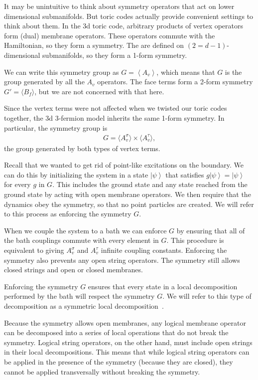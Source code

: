 \documentclass[twocolumn, longbibliography]{revtex4-2}
\newcommand{\ket}[1]{\left|#1\right\rangle}
\begin{document}
It may be unintuitive to think about symmetry operators that act on lower dimensional submanifolds. But toric codes actually provide convenient settings to think about them. In the 3d toric code, arbitrary products of vertex operators form (dual) membrane operators. These operators commute with the Hamiltonian, so they form a symmetry. The are defined on $(2=d-1)$-dimensional submanifolds, so they form a 1-form symmetry. 

We can write this symmetry group as $G=\left\langle A_v\right \rangle$, which means that $G$ is the group generated by all the $A_v$ operators.
The face terms form a 2-form symmetry $G'=\langle B_f\rangle$, but we are not concerned with that here.

Since the vertex terms were not affected when we twisted our toric codes together, the 3d 3-fermion model inherits the same 1-form symmetry. In particular, the symmetry group is 
\begin{align}
G = \langle A_v^\sigma\rangle \times \langle A_v^\tau \rangle,
\end{align}
the group generated by both types of vertex terms.

Recall that we wanted to get rid of point-like excitations on the boundary. We can do this by initializing the system in a state $\ket{\psi}$ that satisfies $g\ket{\psi}=\ket{\psi}$ for every $g$ in $G$. This includes the ground state and any state reached from the ground state by acting with open membrane operators. We then require that the dynamics obey the symmetry, so that no point particles are created. We will refer to this process as enforcing the symmetry $G$.

When we couple the system to a bath we can enforce $G$ by ensuring that all of the bath couplings commute with every element in $G$. This procedure is equivalent to giving $A_v^\sigma$ and $A_v^\tau$ infinite coupling constants. Enforcing the symmetry also prevents any open string operators. The symmetry still allows closed strings and open or closed membranes. 

Enforcing the symmetry $G$ ensures that every state in a local decomposition performed by the bath will respect the symmetry $G$. We will refer to this type of decomposition as a symmetric local decomposition~\cite{RobertsBartlett}.

Because the symmetry allows open membranes, any logical membrane operator can be decomposed into a series of local operations that do not break the symmetry. Logical string operators, on the other hand, must include open strings  in their local decompositions. This means that while logical string operators can be applied in the presence of the symmetry (because they are closed), they cannot be applied transversally without breaking the symmetry.
\end{document}
